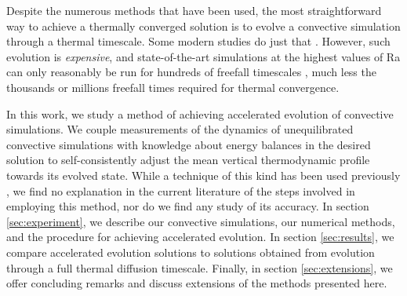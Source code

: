 \documentclass[aps, pre, onecolumn, nofootinbib, notitlepage, groupedaddress, amsfonts, amssymb, amsmath, longbibliography]{revtex4-1}
\begin{document}
Despite the numerous methods that have been used,
the most straightforward way to achieve a thermally converged solution
is to evolve a convective simulation through a thermal timescale. Some modern
studies do just that \cite{featherstone&hindman2016}.
However, such evolution is
\emph{expensive}, and state-of-the-art simulations at the highest values of Ra
can only reasonably be run
for hundreds of freefall timescales \cite{stevens&all2011}, much less the
thousands or millions freefall times required for thermal convergence.

In this work, we study a method of achieving accelerated evolution of
convective simulations. We couple measurements of the dynamics of unequilibrated
convective simulations with knowledge about energy balances in the desired solution
to self-consistently adjust the mean vertical thermodynamic profile towards its evolved state. 
While a technique of this kind has been used previously \cite{hurlburt&all1986}, 
we find no explanation in the current literature of the steps involved in employing
this method, nor do we find any study of its accuracy.
In section \ref{sec:experiment}, we describe our convective simulations, our
numerical methods, and the procedure for achieving accelerated evolution. In
section \ref{sec:results}, we compare accelerated evolution solutions
to solutions obtained from evolution through a full thermal diffusion timescale. Finally,
in section \ref{sec:extensions}, we offer concluding remarks and
discuss extensions of the methods presented here.


\end{document}
